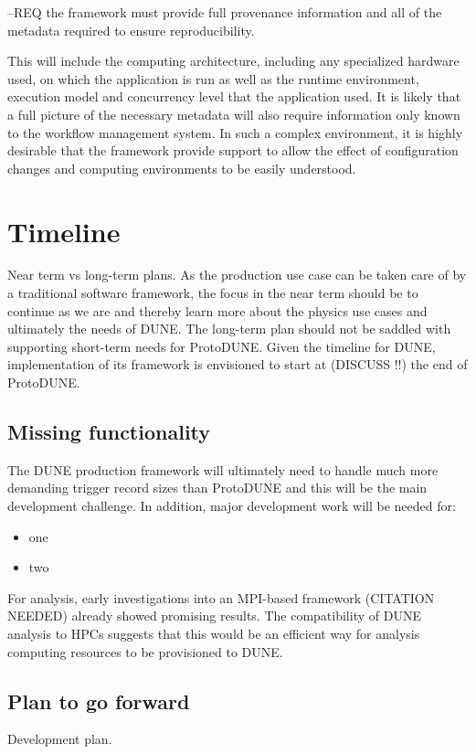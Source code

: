 \documentclass[../main-v1.tex]{subfiles}
\begin{document}
--REQ the framework must provide full provenance information and all of the metadata required to ensure reproducibility.  

This will include the computing architecture, including any specialized hardware used, on which the application is run as well as the runtime environment, execution model and concurrency level that the application used.  It is likely that a full picture of the necessary metadata will also require information only known to the workflow management system.  In such a complex environment, it is highly desirable that the framework provide support to allow the effect of configuration changes and computing environments to be easily understood.



\section{Timeline }

Near term vs long-term plans.  As the production use case can be taken care of by a traditional software framework, the focus in the near term should be to continue as we are and thereby learn more about the physics use cases and ultimately the needs of DUNE.  The long-term plan should not be saddled with supporting short-term needs for ProtoDUNE.  Given the timeline for DUNE, implementation of its framework is envisioned to start at (DISCUSS !!) the end of ProtoDUNE.

\subsection{Missing functionality }

The DUNE production framework will ultimately need to handle much more demanding trigger record sizes than ProtoDUNE and this will be the main development challenge.  In addition, major development work will be needed for:

\begin{itemize}
    \item one
    \item two
\end{itemize}

For analysis, early investigations into an MPI-based framework (CITATION NEEDED) already showed promising results.  The compatibility of DUNE analysis to HPCs suggests that this would be an efficient way for analysis computing resources to be provisioned to DUNE.

\subsection{Plan to go forward }

Development plan.

%
\end{document}
